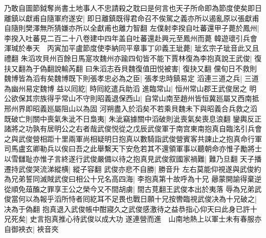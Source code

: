 乃敢自圖節鉞奪尚書土地事人不忠請殺之耽曰是何言也天子所命即為節度使矣即日離鎮以獻甫自隨軍府遂安|{
	即日離鎮既得君命召不俟駕之義亦所以遏亂原以張獻甫自隨則樊澤無所猜嫌亦所以全獻甫也離力智翻}
左僕射李揆自吐蕃還甲子薨於鳳州|{
	李揆入吐蕃見二百二十八卷建中四年盖自吐蕃還赴興元至鳳州而薨}
韓遊瓌引兵會渾瑊於奉天　丙寅加平盧節度使李納同平章事丁卯義王玼薨|{
	玼玄宗子玼音此又且禮翻}
朱滔攻貝州百餘日馬寔攻魏州亦踰四旬皆不能下賈林復為李抱真說王武俊|{
	復扶又翻為于偽翻說輸芮翻}
曰朱滔志呑貝魏復值田悦被害|{
	復抉又翻}
儻旬日不救則魏博皆為滔有矣魏博既下則張孝忠必為之臣|{
	張孝忠時鎮易定}
滔連三道之兵|{
	三道為幽州易定魏博}
益以囘紇|{
	時囘紇遣兵助滔}
進臨常山|{
	恒州常山郡王武俊居之}
明公欲保其宗族得乎常山不守則昭義退保西山|{
	自常山南至趙州皆恒冀廵屬又西南抵邢州界即昭義廵屬阻山以為固}
河朔盡入於滔矣不若乘貝魏未下與昭義合兵救之滔既破亡則關中喪氣朱泚不日梟夷|{
	朱泚竊據關中滔破則泚喪氣矣喪息浪翻}
鑾輿反正諸將之功孰有居明公之右者哉武俊悦從之戊辰武俊軍于南宫東南抱真自臨洺引兵會之與武俊營相距十里兩軍尚相疑明日抱真以數騎詣武俊營賓客共諫止之抱真命行軍司馬盧玄卿勒兵以俟曰吾之此舉繫天下安危若其不還領軍事以聽朝命亦惟子勵將士以雪讎耻亦惟子言終遂行武俊嚴備以待之抱真見武俊叙國家禍難|{
	難乃旦翻}
天子播遷持武俊哭流涕縱横|{
	縱子容翻}
武俊亦悲不自勝|{
	勝音升}
左右莫能仰視遂與武俊約為兄弟誓同滅賊武俊曰相公十兄名高四海|{
	李抱真第十故呼為十兄}
曏蒙開諭得棄逆從順免葅醢之罪享王公之榮今又不間胡虜|{
	間古莧翻王武俊本出於夷落}
辱為兄弟武俊當何以為報乎滔所恃者囘紇耳不足畏也戰日願十兄按轡臨視武俊决為十兄破之|{
	决為于偽翻}
抱真退入武俊帳中酣寢久之武俊感激待之益恭指心仰天曰此身已許十兄死矣|{
	史言抱真推心待武俊以成大功}
遂連營而進　山南地熱上以軍士未有春服亦自御裌衣|{
	裌音夾}


